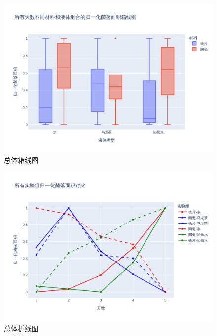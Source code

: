 \documentclass[12pt,a4paper]{ctexart}
\begin{document}
\begin{figure}[H]  %
    \centering  %
    \includegraphics[width=\textwidth]{./plot/General/boxplot_normalized_overall.png}  %
    \caption{总体箱线图}  %
    \label{fig:GeneralBox}  %
\end{figure}

\begin{figure}[H]  %
    \centering  %
    \includegraphics[width=\textwidth]{./plot/General/combined_normalized_line.png}  %
    \caption{总体折线图}  %
    \label{fig:GeneralLine}  %
\end{figure}
\end{document}
